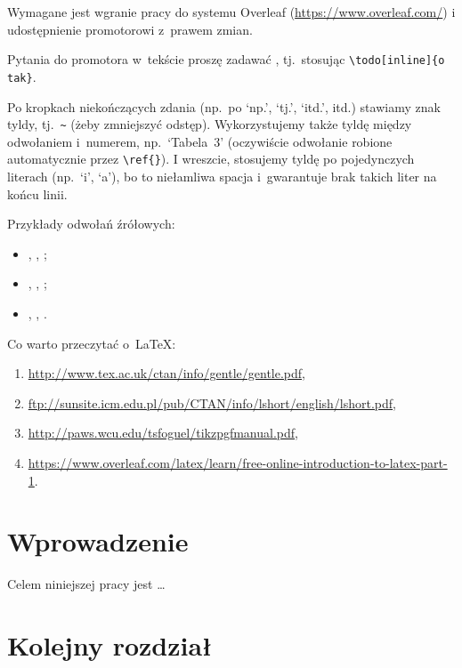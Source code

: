 \documentclass[12pt,a4paper,twoside,openany]{book}
\begin{document}
Wymagane jest wgranie pracy do systemu Overleaf (\url{https://www.overleaf.com/}) i udostępnienie promotorowi z~prawem zmian.

Pytania do promotora w~tekście proszę zadawać , tj.~stosując \verb!\todo[inline]{o tak}!.

Po kropkach niekończących zdania (np.~po `np.', `tj.', `itd.', itd.) stawiamy znak tyldy, tj.~\verb!~! (żeby zmniejszyć odstęp). Wykorzystujemy także tyldę między odwołaniem i~numerem, np.~`Tabela~3' (oczywiście odwołanie robione automatycznie przez \verb!\ref{}!). I wreszcie, stosujemy tyldę po pojedynczych literach (np.~`i', `a'), bo to niełamliwa spacja i~gwarantuje brak takich liter na końcu linii.

Przykłady odwołań źrółowych:
\begin{itemize}
\item \citep{dolan2000}, \citet{dolan2000}, ;
\item \citep{wakker1999}, \citet{wakker1999}, ;
\item \citep{drummond1997}, \citet{drummond1997}, .
\end{itemize}

Co warto przeczytać o~\LaTeX:
\begin{enumerate}
\footnotesize %
\item \url{http://www.tex.ac.uk/ctan/info/gentle/gentle.pdf},
\item \url{ftp://sunsite.icm.edu.pl/pub/CTAN/info/lshort/english/lshort.pdf},
\item \url{http://paws.wcu.edu/tsfoguel/tikzpgfmanual.pdf},
\item \url{https://www.overleaf.com/latex/learn/free-online-introduction-to-latex-part-1}.
\end{enumerate}

\chapter{Wprowadzenie}

Celem niniejszej pracy jest \ldots

\chapter{Kolejny rozdział}
\end{document}
